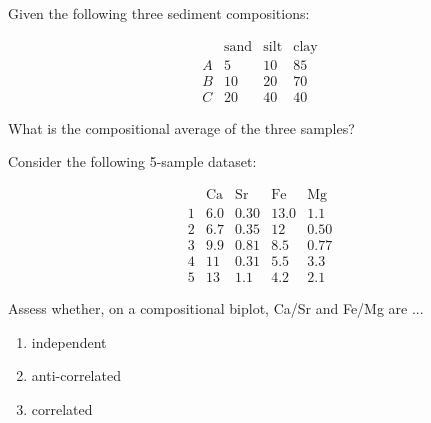 \documentclass{article}
\begin{document}
\vspace{1cm}

\begin{minipage}{10cm}

Given the following three sediment compositions:

\[
\begin{array}{c|ccc}
  & \mbox{sand} & \mbox{silt} & \mbox{clay} \\ \hline
  A & 5 & 10 & 85 \\
  B & 10 & 20 & 70 \\
  C & 20 & 40 & 40
\end{array}
\]

What is the compositional average of the three samples?

\end{minipage}

\vspace{1cm}

\begin{minipage}{12cm}

Consider the following 5-sample dataset:

\[
\begin{array}{c|cccc}
  ~ & \mbox{Ca} & \mbox{Sr} & \mbox{Fe} & \mbox{Mg} \\ \hline
  1 & 6.0 & 0.30 & 13.0 & 1.1 \\
  2 & 6.7 & 0.35 & 12 & 0.50 \\
  3 & 9.9 & 0.81 & 8.5 & 0.77 \\
  4 & 11 & 0.31 & 5.5 & 3.3 \\
  5 & 13 & 1.1 & 4.2 & 2.1
\end{array}
\]

Assess whether, on a compositional biplot, Ca/Sr and Fe/Mg are ...

\begin{enumerate}
\item independent
\item anti-correlated
\item correlated
\end{enumerate}

\end{minipage}
\end{document}

